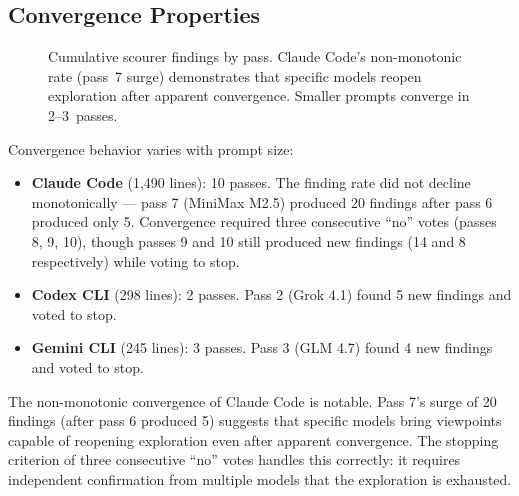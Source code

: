 \subsection{Convergence Properties}

\begin{figure}[t]
\centering
{}
\caption{Cumulative scourer findings by pass. Claude Code's non-monotonic
  rate (pass~7 surge) demonstrates that specific models reopen exploration
  after apparent convergence. Smaller prompts converge in 2--3~passes.}
\label{fig:convergence}
\end{figure}

Convergence behavior varies with prompt size:

\begin{itemize}
\tightlist
\item
  \textbf{Claude Code} (1,490 lines): 10 passes. The finding rate did
  not decline monotonically --- pass 7 (MiniMax M2.5) produced 20
  findings after pass 6 produced only 5. Convergence required three
  consecutive ``no'' votes (passes 8, 9, 10), though passes 9 and 10
  still produced new findings (14 and 8 respectively) while voting to
  stop.
\item
  \textbf{Codex CLI} (298 lines): 2 passes. Pass 2 (Grok 4.1) found 5
  new findings and voted to stop.
\item
  \textbf{Gemini CLI} (245 lines): 3 passes. Pass 3 (GLM 4.7) found 4
  new findings and voted to stop.
\end{itemize}

The non-monotonic convergence of Claude Code is notable. Pass 7's surge
of 20 findings (after pass 6 produced 5) suggests that specific models
bring viewpoints capable of reopening exploration even after apparent
convergence. The stopping criterion of three consecutive ``no'' votes
handles this correctly: it requires independent confirmation from
multiple models that the exploration is exhausted.

